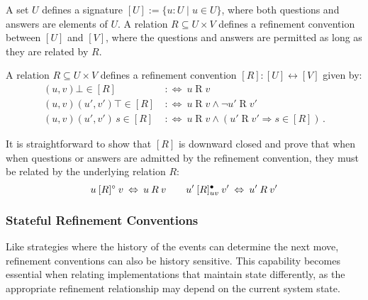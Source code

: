 A set $U$ defines a signature $[U] := \{ u : U \mid u \in U \}$,
where both questions and answers are elements of $U$.
A relation $R \subseteq U \times V$
defines a refinement convention between $[U]$ and $[V]$,
where
the questions and answers
are permitted
as long as they are related by $R$.
\begin{definition}
  A relation $R \subseteq U \times V$ defines
  a refinement convention $[R] : [U] \leftrightarrow [V]$ given by:
  \begin{align*}
    (u, v)\bot \in [R] &\::\Leftrightarrow\:
    u \mathrel{R} v \\
    (u,v)(u',v')\top \in [R] &\::\Leftrightarrow\:
    u \mathrel{R} v \wedge \lnot u' \mathrel{R} v' \\
    (u,v)(u',v')\,s \in [R] &\::\Leftrightarrow\:
    u \mathrel{R} v \wedge (u' \mathrel{R} v' \Rightarrow s \in [R]) \,.
  \end{align*}
\end{definition}
It is straightforward to show that
$[R]$ is downward closed
and prove that when when questions or answers
are admitted by the refinement convention,
they must be related by the underlying relation $R$:
\[
  u \mathbin{[R]^\circ} v \:\Leftrightarrow\: u \mathbin{R} v\qquad
  u' \mathbin{[R]^\bullet_{uv}} v' \:\Leftrightarrow\: u' \mathbin{R} v'
\]

\subsubsection{Stateful Refinement Conventions}

Like strategies
where the history of the events
can determine the next move,
refinement conventions
can also be history sensitive.
This capability becomes essential
when relating implementations
that maintain state differently,
as the appropriate refinement relationship
may depend on the current system state.

